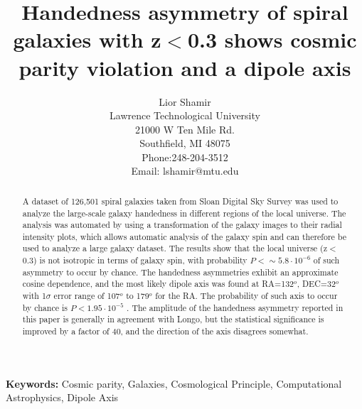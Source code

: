 \documentclass[times,twocolumn]{article}
\begin{document}
\title{Handedness asymmetry of spiral galaxies with z$<$0.3 shows cosmic parity violation and a dipole axis}


\author{Lior Shamir \\ Lawrence Technological University \\21000 W Ten Mile Rd. \\Southfield, MI 48075\\Phone:248-204-3512\\Email: lshamir@mtu.edu}

\date{} 


\maketitle

\begin{abstract}
A dataset of 126,501 spiral galaxies taken from Sloan Digital Sky Survey was used to analyze the large-scale galaxy handedness in different regions of the local universe. The analysis was automated by using a transformation of the galaxy images to their radial intensity plots, which allows automatic analysis of the galaxy spin and can therefore be used to analyze a large galaxy dataset. The results show that the local universe (z$<$0.3) is not isotropic in terms of galaxy spin, with probability $P<\sim5.8\cdot10^{-6}$ of such asymmetry to occur by chance. The handedness asymmetries exhibit an approximate cosine dependence, and the most likely dipole axis was found at RA=132$^o$, DEC=32$^o$ with 1$\sigma$ error range of 107$^o$ to 179$^o$ for the RA. The probability of such axis to occur by chance is $P<1.95\cdot10^{-5}$ . The amplitude of the handedness asymmetry reported in this paper is generally in agreement with Longo, but the statistical significance is improved by a factor of 40, and the direction of the axis disagrees somewhat.
\end{abstract}

\textbf{Keywords:} Cosmic parity, Galaxies, Cosmological Principle, Computational Astrophysics, Dipole Axis \\



\end{document}
